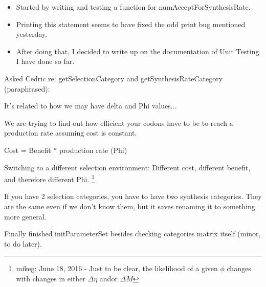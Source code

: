 \documentclass[12pt,hyperref]{labbook}
\newcommand{\DeltaEta}{\ensuremath{\Delta\eta}\xspace}
\newcommand{\DeltaM}{\ensuremath{\Delta M}\xspace}
\newcommand{\sep}{\discretionary{}{}{}} %
\begin{document}

\begin{itemize}
    \item Started by writing and testing a function for numAcceptForSynthesisRate.
    \item Printing this statement seems to have fixed the odd print bug mentioned yesterday.
    \item After doing that, I decided to write up on the documentation of Unit Testing I have done so far.
\end{itemize}

Asked Cedric re: get\sep Selection\sep Category and get\sep Synthesis\sep Rate\sep Category (paraphrased):

\begin{displayquote}
It's related to how we may have delta and Phi values...

We are trying to find out how efficient your codons have to be to reach a production rate
assuming cost is constant.

Cost = Benefit * production rate (Phi)


Switching to a different selection environment:
Different cost, different benefit, and therefore different Phi. \footnote{mikeg: June 18, 2016 
- Just to be clear, the likelihood of a given $\phi$ changes with changes in either 
\DeltaEta and\/or \DeltaM 
}

If you have 2 selection categories, you have to have two synthesis categories. 
They are the same even if we don't know them, but it saves renaming it to something more general.
\end{displayquote}

Finally finished initParameterSet besides checking categories matrix itself (minor, to do later).
\end{document}
